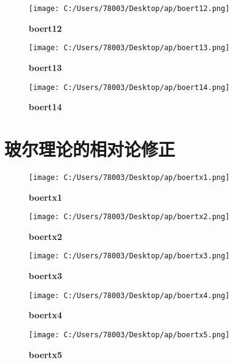 \documentclass[UTF8]{report}
\theoremstyle{MyLineTheoremStyle} %
\theoremstyle{MyBlockTheoremStyle} %
\theoremstyle{MySubsubsectionStyle} %
\begin{document}
\begin{figure}[ht]
    \centering
    \texttt{[image: C:/Users/78003/Desktop/ap/boert12.png]}
    \caption{\textbf{boert12}}
    \label{fig:boert12}
\end{figure}

\begin{figure}[ht]
    \centering
    \texttt{[image: C:/Users/78003/Desktop/ap/boert13.png]}
    \caption{\textbf{boert13}}
    \label{fig:boert13}
\end{figure}

\begin{figure}[ht]
    \centering
    \texttt{[image: C:/Users/78003/Desktop/ap/boert14.png]}
    \caption{\textbf{boert14}}
    \label{fig:boert14}
\end{figure}

\cleardoublepage
\section{玻尔理论的相对论修正}

\begin{figure}[ht]
    \centering
    \texttt{[image: C:/Users/78003/Desktop/ap/boertx1.png]}
    \caption{\textbf{boertx1}}
    \label{fig:boertx1}
\end{figure}

\begin{figure}[ht]
    \centering
    \texttt{[image: C:/Users/78003/Desktop/ap/boertx2.png]}
    \caption{\textbf{boertx2}}
    \label{fig:boertx2}
\end{figure}

\begin{figure}[ht]
    \centering
    \texttt{[image: C:/Users/78003/Desktop/ap/boertx3.png]}
    \caption{\textbf{boertx3}}
    \label{fig:boertx3}
\end{figure}

\begin{figure}[ht]
    \centering
    \texttt{[image: C:/Users/78003/Desktop/ap/boertx4.png]}
    \caption{\textbf{boertx4}}
    \label{fig:boertx4}
\end{figure}

\begin{figure}[ht]
    \centering
    \texttt{[image: C:/Users/78003/Desktop/ap/boertx5.png]}
    \caption{\textbf{boertx5}}
    \label{fig:boertx5}
\end{figure}
\end{document}
